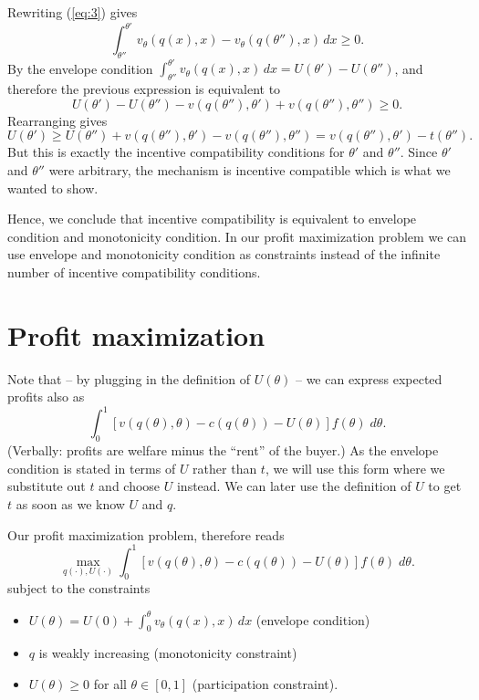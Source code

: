 \documentclass[12pt]{article}
\begin{document}
Rewriting (\ref{eq:3}) gives
\begin{equation*}
  \int_{\theta ''}^{\theta '}v_{\theta }(q(x),x)-v_{\theta }(q(\theta ''), x)\,dx\geq 0.
\end{equation*}
By the envelope condition $\int_{\theta ''}^{\theta '}v_{\theta }(q(x),x)\,dx=U(\theta ')-U(\theta '')$, and therefore the previous expression is equivalent to
\begin{equation*}
  U(\theta ')-U(\theta '')-v(q(\theta ''),\theta ')+v(q(\theta ''),\theta '')\geq 0.
\end{equation*}
Rearranging gives 
\begin{equation*}
  U(\theta ')\geq U(\theta '')+v(q(\theta ''),\theta ')-v(q(\theta ''),\theta '')=v(q(\theta ''),\theta ')-t(\theta '').
\end{equation*}
But this is exactly the incentive compatibility conditions for $\theta '$ and $\theta ''$. Since $\theta '$ and $\theta ''$ were arbitrary, the mechanism is incentive compatible which is what we wanted to show.

Hence, we conclude that incentive compatibility is equivalent to envelope condition and monotonicity condition. In our profit maximization problem we can use envelope and monotonicity condition as constraints instead of the infinite number of incentive compatibility conditions.

\section{Profit maximization}
\label{sec:profit-maximization}

Note that -- by plugging in the definition of $U(\theta )$ -- we can express expected profits also as
$$\int_0^1 [v(q(\theta ),\theta )-c(q(\theta ))-U(\theta )]f(\theta )\;d\theta. $$
(Verbally: profits are welfare minus the ``rent'' of the buyer.) As the envelope condition is stated in terms of $U$ rather than $t$, we will use this form where we substitute out $t$ and choose $U$ instead. We can later use the definition of $U$ to get $t$ as soon as we know $U$ and $q$.

Our profit maximization problem, therefore reads
$$\max_{q(\cdot),U(\cdot)} \int_0^1 [v(q(\theta ),\theta )-c(q(\theta ))-U(\theta )]f(\theta )\;d\theta. $$
subject to the constraints
\begin{itemize}
\item $U(\theta )=U(0)+\int_0^\theta v_\theta (q(x),x)\,dx$ (envelope condition)
\item $q$ is weakly increasing (monotonicity constraint)
  \item $U(\theta )\geq 0$ for all $\theta \in[0,1]$ (participation constraint).
\end{itemize}
\end{document}
